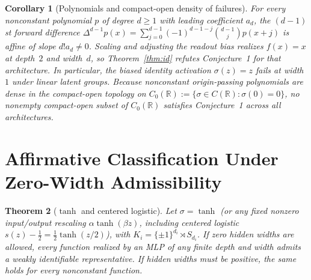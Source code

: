 \documentclass[11pt]{article}
\theoremstyle{plain}
\newtheorem{theorem}{Theorem}
\newtheorem{corollary}[theorem]{Corollary}
\theoremstyle{definition}
\theoremstyle{remark}
\begin{document}
\begin{corollary}[Polynomials and compact-open density of failures]\label{cor:poly}
For every nonconstant polynomial $p$ of degree $d \ge 1$ with leading coefficient $a_d$, the $(d-1)$st forward difference $\Delta^{d-1} p(x) = \sum_{j=0}^{d-1} (-1)^{d-1-j} \binom{d-1}{j} p(x + j)$ is affine of slope $d! a_d \neq 0$. Scaling and adjusting the readout bias realizes $f(x) = x$ at depth~$2$ and width~$d$, so Theorem~\ref{thm:id} refutes Conjecture~1 for that architecture. In particular, the biased identity activation $\sigma(z) = z$ fails at width~$1$ under linear latent groups. Because nonconstant origin-passing polynomials are dense in the compact-open topology on $C_0(\mathbb{R}) := \{\sigma \in C(\mathbb{R}) : \sigma(0) = 0\}$, no nonempty compact-open subset of $C_0(\mathbb{R})$ satisfies Conjecture~1 across all architectures.
\end{corollary}

\section{Affirmative Classification Under Zero-Width Admissibility}

\begin{theorem}[$\tanh$ and centered logistic]\label{thm:tanh}
Let $\sigma = \tanh$ (or any fixed nonzero input/output rescaling $\alpha\tanh(\beta z)$, including centered logistic $s(z) - \tfrac{1}{2} = \tfrac{1}{2}\tanh(z/2)$), with $K_i = \{\pm 1\}^{d_i} \rtimes S_{d_i}$. If zero hidden widths are allowed, every function realized by an MLP of any finite depth and width admits a weakly identifiable representative. If hidden widths must be positive, the same holds for every nonconstant function.
\end{theorem}
\end{document}
